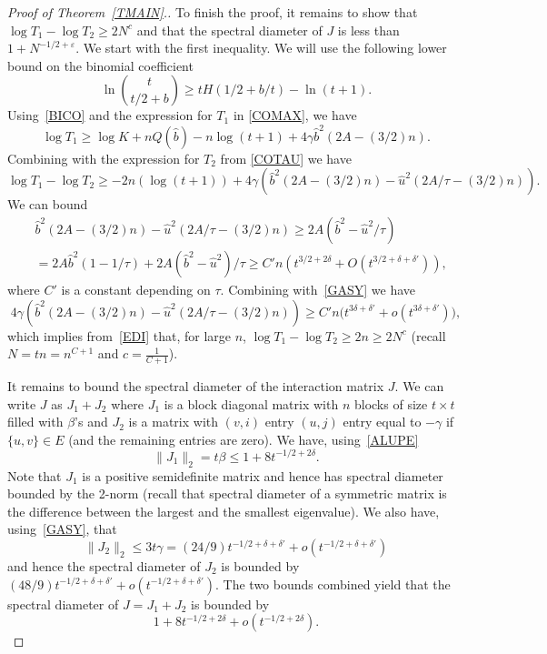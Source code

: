 \documentclass[11pt]{article}
\begin{document}
\begin{proof}[Proof of Theorem~\ref{TMAIN}.]
To finish the proof, it remains to show that $\log T_1-\log T_2\geq 2N^c$ and that the spectral diameter of $J$ is less than $1+N^{-1/2+\varepsilon}$. We start with the first inequality.  We will use the following lower bound on the binomial coefficient
\begin{equation}\label{BICO}
\ln {t\choose t/2+b} \geq t H(1/2 + b/t) - \ln(t+1).
\end{equation}
Using~\eqref{BICO}  and the expression for $T_1$ in \eqref{COMAX}, we have
\begin{equation*}
\log T_1 \geq \log K+ n Q(\hat{b}) - n\log(t+1) + 4 \gamma  \hat{b}^2 (2 A - (3/2)n).
\end{equation*}
Combining with the expression for $T_2$ from \eqref{COTAU} we have
\begin{equation}\label{EDI}
\log T_1 - \log T_2 \geq -2n(\log(t+1)) + 4\gamma \left( 
\hat{b}^2 (2 A - (3/2)n) - \hat{u}^2 (2 A/\tau - (3/2)n) \right).
\end{equation}
We can bound
\begin{equation*}
\begin{split}
& \hat{b}^2 (2 A - (3/2)n) - \hat{u}^2 (2 A/\tau - (3/2)n)
\geq 2A ( \hat{b}^2 - \hat{u}^2/\tau)\\
& = 2A \hat{b}^2 (1-1/\tau) + 2A(\hat{b}^2 - \hat{u}^2)/ \tau
\geq C' n \left( t^{3/2 + 2\delta} + O(t^{3/2+\delta+\delta'}) \right),
\end{split}
\end{equation*}
where $C'$ is a constant depending on $\tau$. Combining with~\eqref{GASY}
we have
$$
4\gamma \left(
\hat{b}^2 (2 A - (3/2)n) - \hat{u}^2 (2 A/\tau - (3/2)n) \right) \geq C' n 
\big( t^{3\delta+\delta'} + o(t^{3\delta+\delta'}) \big),
$$
which implies from~\eqref{EDI} that, for large $n$, $\log T_1 - \log T_2\geq 2n\geq 2N^{c}$ (recall $N=tn=n^{C+1}$ and  $c=\tfrac{1}{C+1}$).

It remains to bound the spectral diameter of the interaction matrix $J$. We can write $J$  as $J_1+J_2$ where $J_1$ is a block diagonal matrix with 
$n$ blocks of size $t\times t$ filled with $\beta$'s and $J_2$ is a matrix with $(v,i)$ entry 
$(u,j)$ entry equal to $-\gamma$ if $\{u,v\}\in E$ (and the remaining entries are zero).
We have, using~\eqref{ALUPE}
\begin{equation*}
\|J_1\|_2 = t\beta \leq 1 + 8t^{-1/2+2\delta}.
\end{equation*}
Note that $J_1$ is a positive semidefinite matrix and hence has spectral diameter bounded  by the 2-norm
(recall that spectral diameter of a symmetric matrix is the difference between the largest and the smallest eigenvalue). We also have, using~\eqref{GASY}, that
\begin{equation*}
\|J_2\|_2 \leq 3t\gamma = (24/9) t^{-1/2+\delta+\delta'} + o(t^{-1/2+\delta+\delta'})
\end{equation*}
and hence the spectral diameter of $J_2$ is bounded by $(48/9) t^{-1/2+\delta+\delta'} + o(t^{-1/2+\delta+\delta'})$.
The two bounds combined yield  that the spectral diameter of $J=J_1+J_2$ is bounded by 
$$1 + 8t^{-1/2+2\delta} + o(t^{-1/2+2\delta}).$$


\end{proof}
\end{document}
